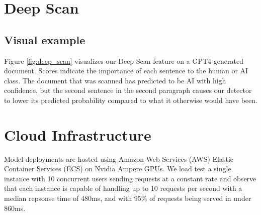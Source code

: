 \documentclass[11pt]{article}
\newcommand{\alexc}[1]{{\color{red}{AC: #1}}}
\begin{document}
\section{Deep Scan}
\label{sec:appendix_deep_scan}
\subsection{Visual example}


Figure \ref{fig:deep_scan} visualizes our Deep Scan feature on a GPT4-generated document. Scores indicate the importance of each sentence to the human or AI class. The document that was scanned has predicted to be AI with high confidence, but the second sentence in the second paragraph causes our detector to lower its predicted probability compared to what it otherwise would have been. 



\section{Cloud Infrastructure}
Model deployments are hosted using Amazon Web Services (AWS) Elastic Container Services (ECS) on Nvidia Ampere GPUs.
We load test a single instance with 10 concurrent users sending requests at a constant rate and observe that each instance is capable of handling up to 10 requests per second with a median repsonse time of 480ms, and with 95\% of requests being served in under 860ms.
\end{document}
